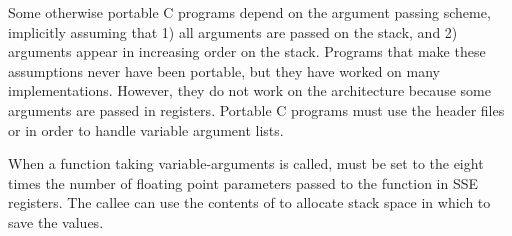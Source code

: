 Some otherwise portable C programs depend on the argument passing
scheme, implicitly assuming that 1) all arguments are passed on the
stack, and 2) arguments appear in increasing order on the stack.
Programs that make these assumptions never have been portable, but
they have worked on many implementations. However, they do not work on
the \xARCH architecture because some arguments are passed in
registers.  Portable C programs must use the header files
 or  in order to handle variable
argument lists.

When a function taking variable-arguments is called,  must be
set to the eight times the number of floating point parameters passed
to the function in SSE registers.  The callee can use the contents of
 to allocate stack space in which to save the values.

